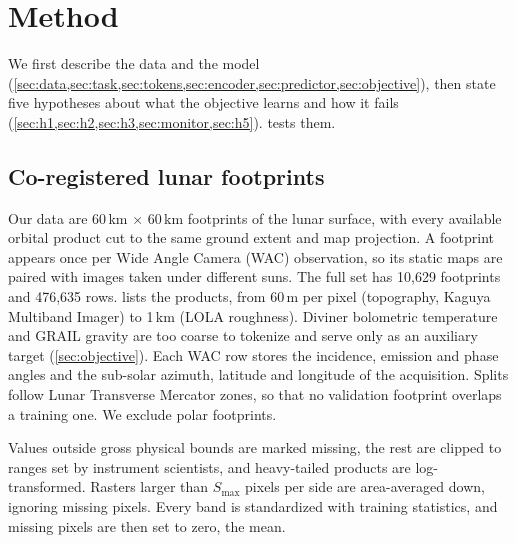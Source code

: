 \section{Method}
\label{sec:method}

We first describe the data and the model (\cref{sec:data,sec:task,sec:tokens,sec:encoder,sec:predictor,sec:objective}), then state five hypotheses about what the objective learns and how it fails (\cref{sec:h1,sec:h2,sec:h3,sec:monitor,sec:h5}).  tests them.

\subsection{Co-registered lunar footprints}
\label{sec:data}

Our data are 60\,km $\times$ 60\,km footprints of the lunar surface, with every available orbital product cut to the same ground extent and map projection. A footprint appears once per Wide Angle Camera (WAC) observation, so its static maps are paired with images taken under different suns. The full set has 10,629 footprints and 476,635 rows.  lists the products, from 60\,m per pixel (topography, Kaguya Multiband Imager) to 1\,km (LOLA roughness). Diviner bolometric temperature and GRAIL gravity are too coarse to tokenize and serve only as an auxiliary target (\cref{sec:objective}). Each WAC row stores the incidence, emission and phase angles and the sub-solar azimuth, latitude and longitude of the acquisition. Splits follow Lunar Transverse Mercator zones, so that no validation footprint overlaps a training one. We exclude polar footprints. 

Values outside gross physical bounds are marked missing, the rest are clipped to ranges set by instrument scientists, and heavy-tailed products are log-transformed. Rasters larger than $S_{\max}$ pixels per side are area-averaged down, ignoring missing pixels. Every band is standardized with training statistics, and missing pixels are then set to zero, the mean.

